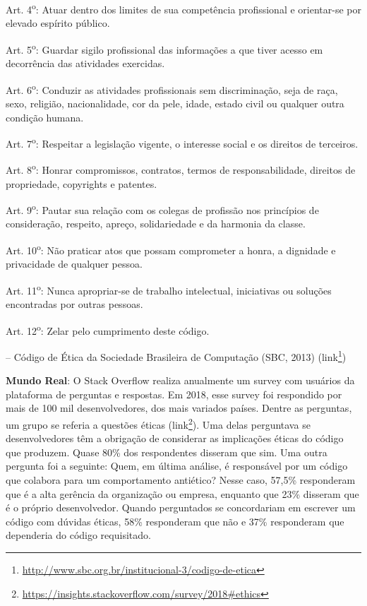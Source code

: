 \documentclass[
  11pt,
  twoside]{book}
\DeclareRobustCommand{\href}[2]{#2\footnote{\url{#1}}}
\renewenvironment{quote}{\centering \vspace{1.5ex} \begin{tcolorbox}[colback=backcolor, width=4.9in]}{\end{tcolorbox}}
\newenvironment{esmbox}{\centering \vspace{1.5ex} \begin{tcolorbox}[breakable, colback=backcolor, width=4.9in]}{\end{tcolorbox} \vspace{1.5ex}}
\begin{document}
\begin{quote}
Art. 4\textsuperscript{o}: Atuar dentro dos limites de sua competência
profissional e orientar-se por elevado espírito público.

Art. 5\textsuperscript{o}: Guardar sigilo profissional das informações a
que tiver acesso em decorrência das atividades exercidas.

Art. 6\textsuperscript{o}: Conduzir as atividades profissionais sem
discriminação, seja de raça, sexo, religião, nacionalidade, cor da pele,
idade, estado civil ou qualquer outra condição humana.

Art. 7\textsuperscript{o}: Respeitar a legislação vigente, o interesse
social e os direitos de terceiros.

Art. 8\textsuperscript{o}: Honrar compromissos, contratos, termos de
responsabilidade, direitos de propriedade, copyrights e patentes.

Art. 9\textsuperscript{o}: Pautar sua relação com os colegas de
profissão nos princípios de consideração, respeito, apreço,
solidariedade e da harmonia da classe.

Art. 10\textsuperscript{o}: Não praticar atos que possam comprometer a
honra, a dignidade e privacidade de qualquer pessoa.

Art. 11\textsuperscript{o}: Nunca apropriar-se de trabalho intelectual,
iniciativas ou soluções encontradas por outras pessoas.

Art. 12\textsuperscript{o}: Zelar pelo cumprimento deste código.

-- Código de Ética da Sociedade Brasileira de Computação (SBC, 2013)
(\href{http://www.sbc.org.br/institucional-3/codigo-de-etica}{link})
\end{quote}

\begin{esmbox}

\textbf{Mundo Real}: O Stack Overflow realiza anualmente um survey com
usuários da plataforma de perguntas e respostas. Em 2018, esse survey
foi respondido por mais de 100 mil desenvolvedores, dos mais variados
países. Dentre as perguntas, um grupo se referia a questões éticas
(\href{https://insights.stackoverflow.com/survey/2018\#ethics}{link}).
Uma delas perguntava se desenvolvedores têm a obrigação de considerar as
implicações éticas do código que produzem. Quase 80\% dos respondentes
disseram que sim. Uma outra pergunta foi a seguinte: Quem, em última
análise, é responsável por um código que colabora para um comportamento
antiético? Nesse caso, 57,5\% responderam que é a alta gerência da
organização ou empresa, enquanto que 23\% disseram que é o próprio
desenvolvedor. Quando perguntados se concordariam em escrever um código
com dúvidas éticas, 58\% responderam que não e 37\% responderam que
dependeria do código requisitado.

\end{esmbox}
\end{document}
